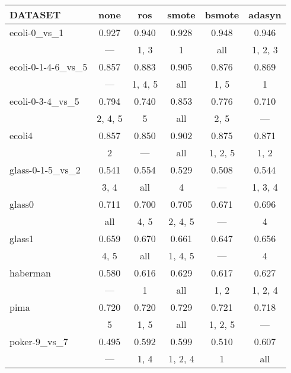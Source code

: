 \begin{tabular}{lccccc}
\hline
 DATASET                    & none    & ros     & smote   & bsmote   & adasyn   \\
\hline
 ecoli-0\_vs\_1               & 0.927   & 0.940   & 0.928   & 0.948    & 0.946    \\
                            & ---     & 1, 3    & 1       & all      & 1, 2, 3  \\
 ecoli-0-1-4-6\_vs\_5         & 0.857   & 0.883   & 0.905   & 0.876    & 0.869    \\
                            & ---     & 1, 4, 5 & all     & 1, 5     & 1        \\
 ecoli-0-3-4\_vs\_5           & 0.794   & 0.740   & 0.853   & 0.776    & 0.710    \\
                            & 2, 4, 5 & 5       & all     & 2, 5     & ---      \\
 ecoli4                     & 0.857   & 0.850   & 0.902   & 0.875    & 0.871    \\
                            & 2       & ---     & all     & 1, 2, 5  & 1, 2     \\
 glass-0-1-5\_vs\_2           & 0.541   & 0.554   & 0.529   & 0.508    & 0.544    \\
                            & 3, 4    & all     & 4       & ---      & 1, 3, 4  \\
 glass0                     & 0.711   & 0.700   & 0.705   & 0.671    & 0.696    \\
                            & all     & 4, 5    & 2, 4, 5 & ---      & 4        \\
 glass1                     & 0.659   & 0.670   & 0.661   & 0.647    & 0.656    \\
                            & 4, 5    & all     & 1, 4, 5 & ---      & 4        \\
 haberman                   & 0.580   & 0.616   & 0.629   & 0.617    & 0.627    \\
                            & ---     & 1       & all     & 1, 2     & 1, 2, 4  \\
 pima                       & 0.720   & 0.720   & 0.729   & 0.721    & 0.718    \\
                            & 5       & 1, 5    & all     & 1, 2, 5  & ---      \\
 poker-9\_vs\_7               & 0.495   & 0.592   & 0.599   & 0.510    & 0.607    \\
                            & ---     & 1, 4    & 1, 2, 4 & 1        & all      \\

\end{tabular}
